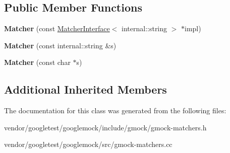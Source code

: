 \subsection*{Public Member Functions}
\begin{DoxyCompactItemize}
\item 
\mbox{\label{classtesting_1_1_matcher_3_01internal_1_1string_01_4_a03a7b1b4a93b762685e2f46d6255d493}} 
{\bfseries Matcher} (const \mbox{\hyperlink{classtesting_1_1_matcher_interface}{Matcher\+Interface}}$<$ internal\+::string $>$ $\ast$impl)
\item 
\mbox{\label{classtesting_1_1_matcher_3_01internal_1_1string_01_4_ae2d21038e4dcc25776187d8bff1665f3}} 
{\bfseries Matcher} (const internal\+::string \&s)
\item 
\mbox{\label{classtesting_1_1_matcher_3_01internal_1_1string_01_4_a65f1d7616edb049ac059ad5d3fa2d625}} 
{\bfseries Matcher} (const char $\ast$s)
\end{DoxyCompactItemize}
\subsection*{Additional Inherited Members}


The documentation for this class was generated from the following files\+:\begin{DoxyCompactItemize}
\item 
vendor/googletest/googlemock/include/gmock/gmock-\/matchers.\+h\item 
vendor/googletest/googlemock/src/gmock-\/matchers.\+cc\end{DoxyCompactItemize}
